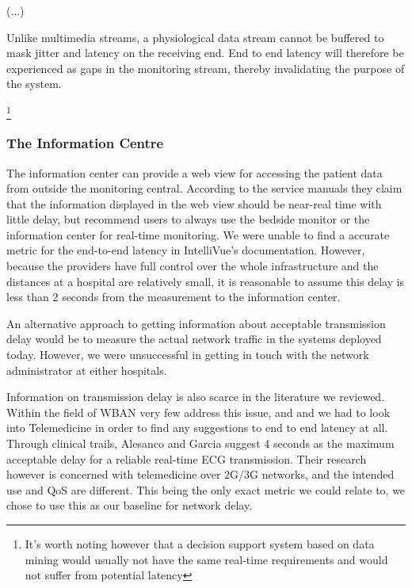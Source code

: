 \cite{}
(...)

Unlike multimedia streams, a physiological data stream cannot be buffered to mask jitter and latency on the receiving end. End to end latency will therefore be experienced as gaps in the monitoring stream, thereby invalidating the purpose of the system.


\footnote{It's worth noting however that a decision support system based on data mining would usually not have the same real-time requirements and would not suffer from potential latency}


\subsubsection{The Information Centre} %
\label{ssub:the_information_centre}

The information center can provide a web view for accessing the patient data from outside the monitoring central. According to the service manuals they claim that the information displayed in the web view should be near-real time with little delay, but recommend users to always use the bedside monitor or the information center for real-time monitoring. We were unable to find a accurate metric for the end-to-end latency in IntelliVue's documentation. However, because the providers have full control over the whole infrastructure and the distances at a hospital are relatively small, it is reasonable to assume this delay is less than 2 seconds from the measurement to the information center.

An alternative approach to getting information about acceptable transmission delay would be to measure the actual network traffic in the systems deployed today. However, we were unsuccessful in getting in touch with the network administrator at either hospitals.

Information on transmission delay is also scarce in the literature we reviewed. Within the field of WBAN very few address this issue, and and we had to look into Telemedicine in order to find any suggestions to end to end latency at all. Through clinical trails, Alesanco and Garcia suggest 4 seconds as the maximum acceptable delay for a reliable real-time ECG transmission. Their research however is concerned with telemedicine over 2G/3G networks, and the intended use and QoS are different. This being the only exact metric we could relate to, we chose to use this as our baseline for network delay.

